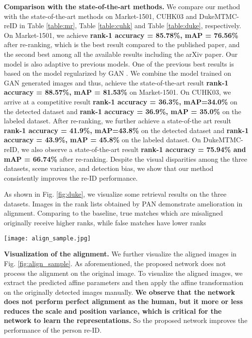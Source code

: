 \textbf{Comparison with the state-of-the-art methods.} We compare our method with the state-of-the-art methods on Market-1501, CUHK03 and DukeMTMC-reID in Table \ref{table:mr}, Table \ref{table:cuhk} and Table \ref{table:duke}, respectively. On  Market-1501, we achieve \textbf{rank-1 accuracy = 85.78\%, mAP = 76.56\%} after re-ranking, which is the best result compared to the published paper, and the second best among all the available results including the arXiv paper. Our model is also adaptive to previous models. One of the previous best results is based on the model regularized by GAN \cite{zheng2017unlabeled}. We combine the model trained on GAN generated images and thus, achieve the state-of-the-art result \textbf{rank-1 accuracy = 88.57\%, mAP = 81.53\%} on Market-1501. 
On CUHK03, we arrive at a competitive result \textbf{rank-1 accuracy = 36.3\%, mAP=34.0\%} on the detected dataset and \textbf{rank-1 accuracy = 36.9\%, mAP = 35.0\%} on the labeled dataset. After re-ranking, we further achieve a state-of-the art result \textbf{rank-1 accuracy = 41.9\%, mAP=43.8\%} on the detected dataset and \textbf{rank-1 accuracy = 43.9\%, mAP = 45.8\%} on the labeled dataset.
On DukeMTMC-reID, we also observe a state-of-the-art result \textbf{rank-1 accuracy = 75.94\% and mAP = 66.74\%} after re-ranking. Despite the visual disparities among the three datasets, \ie scene variance, and detection bias, we show that our method consistently improves the re-ID performance.

As shown in Fig. \ref{fig:duke}, we visualize some retrieval results on the three datasets. Images in the rank lists obtained by PAN demonstrate amelioration in alignment. Comparing to the baseline, true matches which are misaligned originally receive higher ranks, while false matches have lower ranks

\begin{figure*}[t]
\begin{center}
\texttt{[image: align\_sample.jpg]}
\end{center}
   \caption{Examples of pedestrian images before and after alignment on three datasets (Market-1501, DukeMTMC-reID and CUHK03). Pairs of input images and aligned images are shown. By removing excessive background or padding zeros to image borders, we observe that PAN reduces the scale and location variance.}
\label{fig:align_sample}
\end{figure*}

\textbf{Visualization of the alignment.} We further visualize the aligned images in Fig. \ref{fig:align_sample}. As aforementioned, the proposed network does not process the alignment on the original image. To visualize the aligned images, we extract the predicted affine parameters and then apply the affine transformation on the originally detected images manually. \textbf{We observe that the network does not perform perfect alignment as the human, but it more or less reduces the scale and position variance, which is critical for the network to learn the representations.} So the proposed network improves the performance of the person re-ID.



